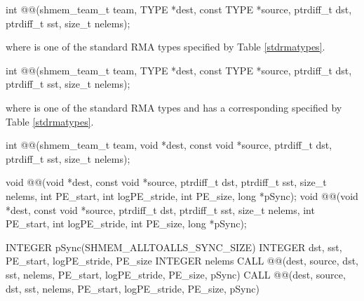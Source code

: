 
\begin{apidefinition}

{\color{Green}
\begin{C11synopsis}
int @@(shmem_team_t team, TYPE *dest, const TYPE *source, ptrdiff_t dst, ptrdiff_t sst, size_t nelems);
\end{C11synopsis}
where \TYPE{} is one of the standard \ac{RMA} types specified by Table \ref{stdrmatypes}.
}

\begin{Csynopsis}
\end{Csynopsis}
{\color{Green}
\begin{CsynopsisCol}
int @@(shmem_team_t team, TYPE *dest, const TYPE *source, ptrdiff_t dst, ptrdiff_t sst, size_t nelems);
\end{CsynopsisCol}
where \TYPE{} is one of the standard \ac{RMA} types and has a corresponding \TYPENAME{} specified by Table \ref{stdrmatypes}.

\begin{CsynopsisCol}
int @@(shmem_team_t team, void *dest, const void *source, ptrdiff_t dst, ptrdiff_t sst, size_t nelems);
\end{CsynopsisCol}
}

\begin{DeprecateBlock}
\begin{CsynopsisCol}
void @@(void *dest, const void *source, ptrdiff_t dst, ptrdiff_t sst, size_t nelems, int PE_start, int logPE_stride, int PE_size, long *pSync);
void @@(void *dest, const void *source, ptrdiff_t dst, ptrdiff_t sst, size_t nelems, int PE_start, int logPE_stride, int PE_size, long *pSync);
\end{CsynopsisCol}
\end{DeprecateBlock}

\begin{Fsynopsis}
INTEGER pSync(SHMEM_ALLTOALLS_SYNC_SIZE)
INTEGER dst, sst, PE_start, logPE_stride, PE_size
INTEGER nelems 
CALL @@(dest, source, dst, sst, nelems, PE_start, logPE_stride, PE_size, pSync)
CALL @@(dest, source, dst, sst, nelems, PE_start, logPE_stride, PE_size, pSync)
\end{Fsynopsis}


\end{apidefinition}
